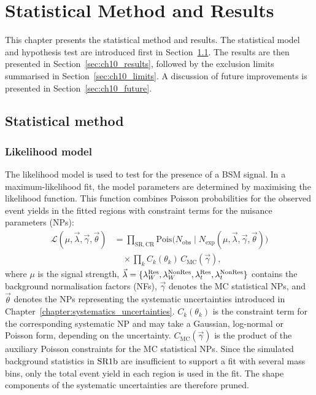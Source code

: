 \chapter{Statistical Method and Results}
\label{chapter:results}

This chapter presents the statistical method and results. The statistical model and hypothesis test are introduced first in Section~\ref{sec:ch10_statistical_model}. The results are then presented in Section~\ref{sec:ch10_results}, followed by the exclusion limits summarised in Section~\ref{sec:ch10_limits}. A discussion of future improvements is presented in Section~\ref{sec:ch10_future}.

\section{Statistical method}
\label{sec:ch10_statistical_model}

\subsection{Likelihood model}
\label{subsec:ch10_likelihood_model}
The likelihood model is used to test for the presence of a BSM signal. In a maximum-likelihood fit, the model parameters are determined by maximising the likelihood function. This function combines Poisson probabilities for the observed event yields in the fitted regions with constraint terms for the nuisance parameters (NPs):
\begin{align}
 \mathcal{L}(\mu,\vec{\lambda},\vec{\gamma},\vec{\theta})
 &=\prod_{\mathrm{SR,CR}}\mathrm{Pois}\bigl(N_{\mathrm{obs}}\mid N_{\mathrm{exp}}(\mu,\vec{\lambda},\vec{\gamma},\vec{\theta})\bigr)
 \nonumber\\
 &\quad\times\prod_k C_k(\theta_k)\,C_{\mathrm{MC}}(\vec{\gamma}),
 \label{eq:ch10_likelihood}
\end{align}
where $\mu$ is the signal strength, $\vec{\lambda}=\{\lambda_W^{\mathrm{Res}},\lambda_W^{\mathrm{NonRes}},\lambda_t^{\mathrm{Res}},\lambda_t^{\mathrm{NonRes}}\}$ contains the background normalisation factors (NFs), $\vec{\gamma}$ denotes the MC statistical NPs, and $\vec{\theta}$ denotes the NPs representing the systematic uncertainties introduced in Chapter~\ref{chapter:systematics_uncertainties}.
$C_k(\theta_k)$ is the constraint term for the corresponding systematic NP and may take a Gaussian, log-normal or Poisson form, depending on the uncertainty.
$C_{\mathrm{MC}}(\vec{\gamma})$ is the product of the auxiliary Poisson constraints for the MC statistical NPs.
Since the simulated background statistics in $\mathrm{SR1b}$ are insufficient to support a fit with several mass bins, only the total event yield in each region is used in the fit. The shape components of the systematic uncertainties are therefore pruned.

